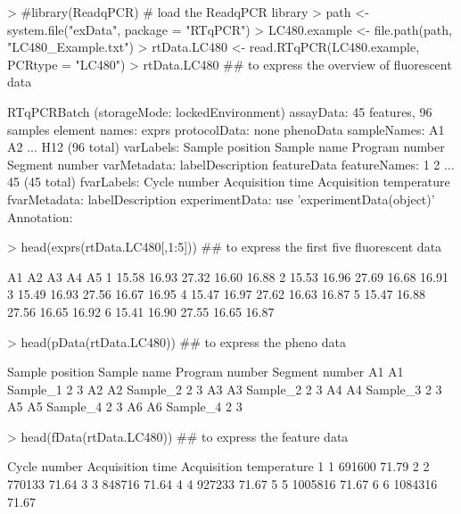 \documentclass[11pt]{article}
\begin{document}
\begin{Schunk}
\begin{Sinput}
> #library(ReadqPCR) # load the ReadqPCR library
> path <- system.file("exData", package = "RTqPCR")
> LC480.example <- file.path(path, "LC480_Example.txt") 
> rtData.LC480 <- read.RTqPCR(LC480.example, PCRtype = "LC480")
> rtData.LC480 ## to express the overview of fluorescent data
\end{Sinput}
\begin{Soutput}
RTqPCRBatch (storageMode: lockedEnvironment)
assayData: 45 features, 96 samples 
  element names: exprs 
protocolData: none
phenoData
  sampleNames: A1 A2 ... H12 (96 total)
  varLabels: Sample position Sample name Program number Segment number
  varMetadata: labelDescription
featureData
  featureNames: 1 2 ... 45 (45 total)
  fvarLabels: Cycle number Acquisition time Acquisition temperature
  fvarMetadata: labelDescription
experimentData: use 'experimentData(object)'
Annotation:  
\end{Soutput}
\begin{Sinput}
> head(exprs(rtData.LC480[,1:5])) ## to express the first five fluorescent data
\end{Sinput}
\begin{Soutput}
     A1    A2    A3    A4    A5
1 15.58 16.93 27.32 16.60 16.88
2 15.53 16.96 27.69 16.68 16.91
3 15.49 16.93 27.56 16.67 16.95
4 15.47 16.97 27.62 16.63 16.87
5 15.47 16.88 27.56 16.65 16.92
6 15.41 16.90 27.55 16.65 16.87
\end{Soutput}
\begin{Sinput}
> head(pData(rtData.LC480)) ## to express the pheno data
\end{Sinput}
\begin{Soutput}
   Sample position Sample name Program number Segment number
A1              A1    Sample_1              2              3
A2              A2    Sample_2              2              3
A3              A3    Sample_2              2              3
A4              A4    Sample_3              2              3
A5              A5    Sample_4              2              3
A6              A6    Sample_4              2              3
\end{Soutput}
\begin{Sinput}
> head(fData(rtData.LC480)) ## to express the feature data
\end{Sinput}
\begin{Soutput}
  Cycle number Acquisition time Acquisition temperature
1            1           691600                   71.79
2            2           770133                   71.64
3            3           848716                   71.64
4            4           927233                   71.67
5            5          1005816                   71.67
6            6          1084316                   71.67
\end{Soutput}
\end{Schunk}
 
\end{document}

